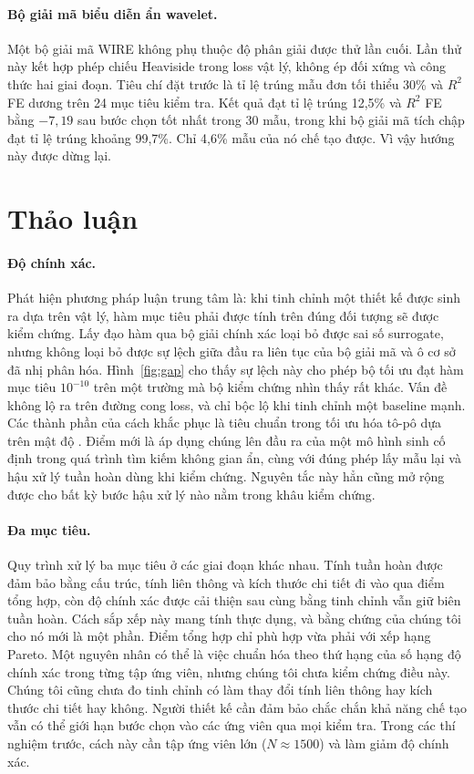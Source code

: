 \documentclass[a4paper,11pt]{article}
\newcommand{\RR}{R^2}
\begin{document}
\paragraph{Bộ giải mã biểu diễn ẩn wavelet.}
Một bộ giải mã WIRE không phụ thuộc độ phân giải \citep{saragadam2023wire}
được thử lần cuối. Lần thử này kết hợp phép chiếu Heaviside trong loss vật
lý, không ép đối xứng và công thức hai giai đoạn. Tiêu chí đặt trước là tỉ
lệ trúng mẫu đơn tối thiểu 30\% và $\RR$ FE dương trên 24 mục tiêu kiểm tra.
Kết quả đạt tỉ lệ trúng 12,5\% và $\RR$ FE bằng $-7{,}19$ sau bước chọn tốt
nhất trong 30 mẫu, trong khi bộ giải mã tích chập đạt tỉ lệ trúng khoảng
99,7\%. Chỉ 4,6\% mẫu của nó chế tạo được. Vì vậy hướng này được dừng lại.

\section{Thảo luận}

\paragraph{Độ chính xác.}
Phát hiện phương pháp luận trung tâm là: khi tinh chỉnh một thiết kế được
sinh ra dựa trên vật lý, hàm mục tiêu phải được tính trên đúng đối tượng sẽ
được kiểm chứng. Lấy đạo hàm qua bộ giải chính xác loại bỏ được sai số
surrogate, nhưng không loại bỏ được sự lệch giữa đầu ra liên tục của bộ giải
mã và ô cơ sở đã nhị phân hóa. Hình~\ref{fig:gap} cho thấy sự lệch này cho
phép bộ tối ưu đạt hàm mục tiêu $10^{-10}$ trên một trường mà bộ kiểm chứng
nhìn thấy rất khác. Vấn đề không lộ ra trên đường cong loss, và chỉ bộc lộ
khi tinh chỉnh một baseline mạnh. Các thành phần của cách khắc phục là tiêu
chuẩn trong tối ưu hóa tô-pô dựa trên mật độ
\citep{guest2004achieving,wang2011projection}. Điểm mới là áp dụng chúng lên
đầu ra của một mô hình sinh cố định trong quá trình tìm kiếm không gian ẩn,
cùng với đúng phép lấy mẫu lại và hậu xử lý tuần hoàn dùng khi kiểm chứng.
Nguyên tắc này hẳn cũng mở rộng được cho bất kỳ bước hậu xử lý nào nằm trong
khâu kiểm chứng.

\paragraph{Đa mục tiêu.}
Quy trình xử lý ba mục tiêu ở các giai đoạn khác nhau. Tính tuần hoàn được
đảm bảo bằng cấu trúc, tính liên thông và kích thước chi tiết đi vào qua
điểm tổng hợp, còn độ chính xác được cải thiện sau cùng bằng tinh chỉnh vẫn
giữ biên tuần hoàn. Cách sắp xếp này mang tính thực dụng, và bằng chứng của
chúng tôi cho nó mới là một phần. Điểm tổng hợp chỉ phù hợp vừa phải với xếp
hạng Pareto. Một nguyên nhân có thể là việc chuẩn hóa theo thứ hạng của số
hạng độ chính xác trong từng tập ứng viên, nhưng chúng tôi chưa kiểm chứng
điều này. Chúng tôi cũng chưa đo tinh chỉnh có làm thay đổi tính liên thông
hay kích thước chi tiết hay không. Người thiết kế cần đảm bảo chắc chắn khả
năng chế tạo vẫn có thể giới hạn bước chọn vào các ứng viên qua mọi kiểm
tra. Trong các thí nghiệm trước, cách này cần tập ứng viên lớn
($N\approx1500$) và làm giảm độ chính xác.
\end{document}
